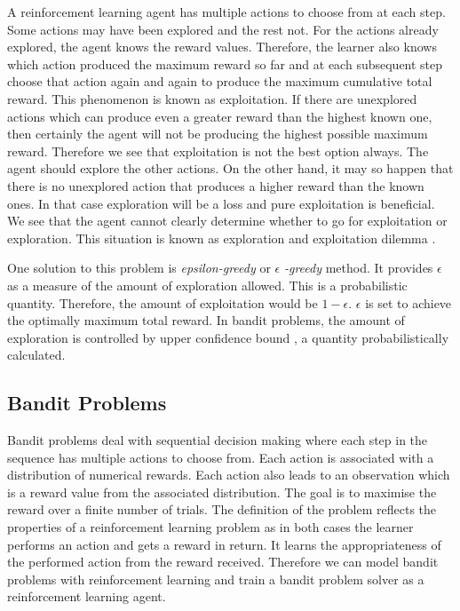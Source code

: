 \documentclass[english]{tktltiki}
\begin{document}
A reinforcement learning agent has multiple actions to choose from at each step. Some actions may have been explored and the rest not. For the actions already explored, the agent knows the reward values. Therefore, the learner also knows which action produced the maximum reward so far and at each subsequent step choose that action again and again to produce the maximum cumulative total reward. This phenomenon is known as exploitation. If there are unexplored actions which can produce even a greater reward than the highest known one, then certainly the agent will not be producing the highest possible maximum reward. Therefore we see that exploitation is not the best option always. The agent should explore the other actions. On the other hand, it may so happen that there is no unexplored action that produces a higher reward than the known ones. In that case exploration will be a loss and pure exploitation is beneficial. We see that the agent cannot clearly determine whether to go for exploitation or exploration. This situation is known as exploration and exploitation dilemma \cite{reinforcement_learning}.

One solution to this problem is \textit{epsilon-greedy} \cite{reinforcement_learning} or $\epsilon$ \textit{-greedy} method. It provides $\epsilon$ as a measure of the amount of exploration allowed. This is a probabilistic quantity. Therefore, the amount of exploitation would be $1 - \epsilon$. $\epsilon$ is set to achieve the optimally maximum total reward. In bandit problems, the amount of exploration is controlled by upper confidence bound \cite{ucb}, a quantity probabilistically calculated.


\subsection{Bandit Problems}

Bandit problems \cite{bandits} deal with sequential decision making where each step in the sequence has multiple actions to choose from. Each action is associated with a distribution of numerical rewards. Each action also leads to an observation which is a reward value from the associated distribution. The goal is to maximise the reward over a finite number of trials. The definition of the problem reflects the properties of a reinforcement learning problem as in both cases the learner performs an action and gets a reward in return. It learns the appropriateness of the performed action from the reward received. Therefore we can model bandit problems with reinforcement learning and train a bandit problem solver as a reinforcement learning agent.
\end{document}
